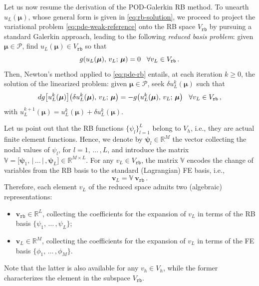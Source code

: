 \documentclass[12pt, a4paper, twoside, openright, notitlepage]{report}
\numberwithin{equation}{chapter}
\theoremstyle{theorem}
\theoremstyle{definition}
\theoremstyle{remark}
\theoremstyle{proposition}
\numberwithin{figure}{chapter}
\newcommand{\bg}[1]{\boldsymbol{#1}}
\begin{document}
		Let us now resume the derivation of the POD-Galerkin RB method. To unearth $u_L(\bg{\mu})$, whose general form is given in \eqref{eq:rb-solution}, we proceed to project the variational problem \eqref{eq:pde-weak-reference} onto the RB space $V_{\texttt{rb}}$ by pursuing a standard Galerkin approach, leading to the following \emph{reduced basis problem}: given $\bg{\mu} \in \mathcal{P}$, find $u_L(\bg{\mu}) \in V_{\texttt{rb}}$ so that
		\begin{equation}
			\label{eq:pde-rb}
			g(u_L(\bg{\mu}), \, v_L; \, \bg{\mu}) = 0 \hspace*{0.3cm} \forall v_L \in V_{\texttt{rb}} \, .
		\end{equation}
		Then, Newton's method applied to \eqref{eq:pde-rb} entails, at each iteration $k \geq 0$, the solution of the linearized problem: given $\bg{\mu} \in \mathcal{P}$, seek $\delta u_{L}^k(\bg{\mu})$ such that
		\begin{equation*}
			\label{eq:pde-rb-newton}
			dg \big[ u_{L}^k(\bg{\mu}) \big] \big( \delta u_{L}^k(\bg{\mu}), \, v_{L}; \, \bg{\mu} \big) = - g \big( u_{L}^k(\bg{\mu}), \, v_{L}; \, \bg{\mu} \big) \hspace*{0.3cm} \forall v_{L} \in V_{\texttt{rb}} \, ,
		\end{equation*}
		with $u_{L}^{k+1}(\bg{\mu}) = u_{L}^k(\bg{\mu}) + \delta u_{L}^k(\bg{\mu})$.
		
		Let us point out that the RB functions $\big\lbrace \psi_l \big\rbrace_{l = 1}^L$ belong to $V_h$, i.e., they are actual finite element functions. Hence, we denote by $\bg{\psi}_l \in \mathbb{R}^M$ the vector collecting the nodal values of $\psi_l$, for $l = 1, \, \ldots \, , L$, and introduce the matrix $\mathbb{V} = \big[ \bg{\psi}_1, \, \big| \, \ldots \, \big| \, , \bg{\psi}_L \big] \in \mathbb{R}^{M \times L}$. For any $v_{L} \in V_{\texttt{rb}}$, the matrix $\mathbb{V}$ encodes the change of variables from the RB basis to the standard (Lagrangian) FE basis, i.e.,
		\begin{equation}
			\label{eq:rb-fe-coefficients}
			\mathbf{v}_L = \mathbb{V} ~ \mathbf{v}_{\texttt{rb}} \, .
		\end{equation}
		Therefore, each element $v_{L}$ of the reduced space admits two (algebraic) representations:
		\begin{itemize}
			\item $\mathbf{v}_{\texttt{rb}} \in \mathbb{R}^L$, collecting the coefficients for the expansion of $v_{L}$ in terms of the RB basis $\big\lbrace \psi_1, \, \ldots \, , \psi_L \big\rbrace$;
			\item $\mathbf{v}_{L} \in \mathbb{R}^M$, collecting the coefficients for the expansion of $v_{L}$ in terms of the FE basis $\big\lbrace \phi_1, \, \ldots \, , \phi_M \big\rbrace$.
		\end{itemize}
		Note that the latter is also available for any $v_h \in V_h$, while the former characterizes the element in the subspace $V_{\texttt{rb}}$.
		
\end{document}
